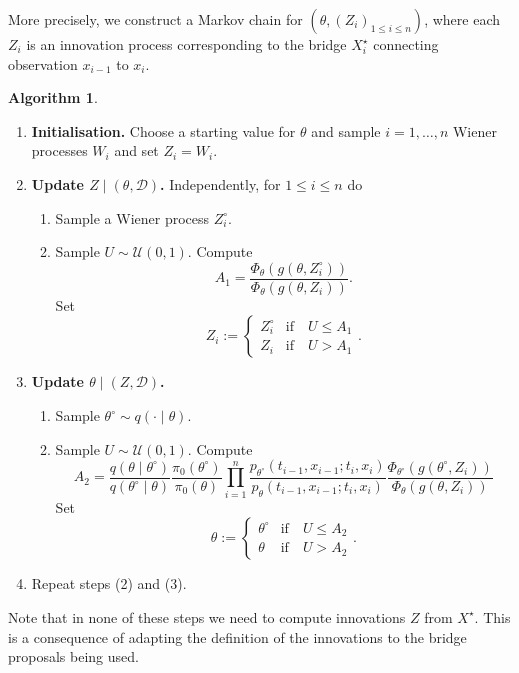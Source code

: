 \documentclass[preprint]{imsart}
\renewcommand{\th}{\theta}
\newcommand{\scr}[1]{{\mathcal #1}}
\theoremstyle{definition}
\newtheorem{algorithm}{Algorithm}
\begin{document}
More precisely, we construct  a Markov chain for  $(\th, (Z_i)_{ 1\le i \le n})$, where each $Z_i$ is an innovation process corresponding to the bridge $X^\star_i$ connecting observation $x_{i-1}$ to $x_{i}$.

\begin{algorithm}\label{alg1}\ 


\begin{enumerate}
\item {\bf Initialisation.} Choose a starting value for $\th$ and sample $i = 1,\dots, n$ Wiener processes $W_i$ and set $Z_i = W_i$. 

\item {\bf Update $Z \mid (\th, \scr{D})$.} Independently, for $1\le i \le n$ do
\begin{enumerate}
\item  Sample a Wiener process $Z^\circ_i$.
\item  Sample $U \sim \scr{U}(0,1)$. Compute
\[ A_1 =\frac{\Phi_{\th}(g(\th,Z^\circ_i))}{\Phi_{\th}(g(\th, Z_i))}. \]
Set 
\[ Z_i := \begin{cases} Z^\circ_i& \text{if}\quad U\le A_1 \\
 Z_i & \text{if}\quad U> A_1 \end{cases}. \]
\end{enumerate}

\item {\bf Update $\th \mid (Z, \scr{D})$.} 
\begin{enumerate}
\item  Sample ${\th^\circ} \sim q(\cdot \mid \th)$.
\item  Sample $U \sim \scr{U}(0,1)$. Compute
\[	 A_2=\frac{q(\th \mid {\th^\circ})}{q({\th^\circ} \mid \th)}  \frac{\pi_0({\th^\circ})}{\pi_0(\th)} \prod_{i=1}^n \frac{p_{{\th^\circ}}(t_{i-1},x_{i-1}; t_i, x_i)}{p_{\th}(t_{i-1},x_{i-1}; t_i, x_i)}
\frac{\Phi_{\th^\circ}(g({\th^\circ}, Z_i))}{\Phi_{\th}(g(\th,Z_i))} \]
Set 
\[\th := \begin{cases} {\th^\circ} & \text{if}\quad U\le A_2 \\
 \th & \text{if}\quad U> A_2 \end{cases}. \]
\end{enumerate}
\item Repeat steps (2) and (3).
\end{enumerate}
\end{algorithm}

Note that in none of these steps we need to compute innovations $Z$ from $X^\star$.  This is a consequence of adapting the definition of the innovations to the bridge proposals being used. 
\end{document}
